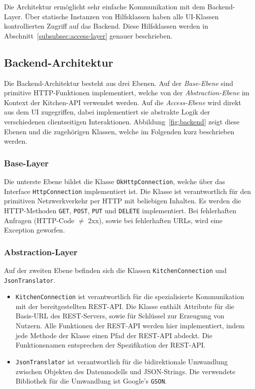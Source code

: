 Die Architektur ermöglicht sehr einfache Kommunikation mit dem Backend-Layer.
Über statische Instanzen von Hilfsklassen haben alle UI-Klassen kontrollierten Zugriff auf das Backend.
Diese Hilfsklassen werden in Abschnitt~\ref{subsubsec:access-layer} genauer beschrieben.

\subsection{Backend-Architektur}\label{subsec:backend}

Die Backend-Architektur besteht aus drei Ebenen.
Auf der \emph{Base-Ebene} sind primitive HTTP-Funktionen implementiert,
welche von der \emph{Abstraction-Ebene} im Kontext der Kitchen-API verwendet werden.
Auf die \emph{Access-Ebene} wird direkt aus dem UI zugegriffen, dabei implementiert sie abstrakte Logik der verschiedenen clientseitigen Interaktionen.
Abbildung~\ref{fig:backend} zeigt diese Ebenen und die zugehörigen Klassen, welche im Folgenden kurz beschrieben werden.


\subsubsection{Base-Layer}

Die unterste Ebene bildet die Klasse \texttt{OkHttpConnection}, welche über das Interface \texttt{HttpConnection} implementiert ist.
Die Klasse ist verantwortlich für den primitiven Netzwerkverkehr per HTTP mit beliebigen Inhalten.
Es werden die HTTP-Methoden \texttt{GET}, \texttt{POST}, \texttt{PUT} und \texttt{DELETE} implementiert.
Bei fehlerhaften Anfragen (HTTP-Code $\neq$ 2xx), sowie bei fehlerhaften URLs, wird eine Exception geworfen.

\subsubsection{Abstraction-Layer}

Auf der zweiten Ebene befinden sich die Klassen \texttt{KitchenConnection} und \texttt{JsonTranslator}.

\begin{itemize}
	\item  \texttt{KitchenConnection} ist verantwortlich für die spezialisierte Kommunikation mit der bereitgestellten REST-API. Die Klasse enthält Attribute für die Basis-URL des REST-Servers, sowie für Schlüssel zur Erzeugung von Nutzern.
	Alle Funktionen der REST-API werden hier implementiert, indem jede Methode der Klasse einen Pfad der REST-API abdeckt.
	Die Funktionsnamen entsprechen der Spezifikation der REST-API\@.

	\item \texttt{JsonTranslator} ist verantwortlich für die bidirektionale Umwandlung zwischen Objekten des Datenmodells und JSON-Strings.
	Die verwendete Bibliothek für die Umwandlung ist Google's \texttt{GSON}.
\end{itemize}

